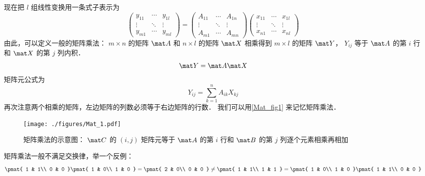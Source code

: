 现在把 $l$ 组线性变换用一条式子表示为
\begin{equation}
\begin{pmatrix}
y_{11} & \cdots & y_{1l} \\
 \vdots & \ddots & \vdots \\
y_{m1} & \cdots & y_{ml}
\end{pmatrix}
=
\begin{pmatrix}
A_{11} & \cdots & A_{1n} \\
 \vdots & \ddots & \vdots \\
A_{m1} & \cdots & A_{mn}
\end{pmatrix}
\begin{pmatrix}
x_{11} & \cdots & x_{1l} \\
 \vdots & \ddots & \vdots \\
x_{n1} & \cdots & x_{nl}
\end{pmatrix}
\end{equation}
由此，可以定义一般的矩阵乘法： $m \times n$ 的矩阵 $\mat A$ 和 $n \times l$ 的矩阵 $\mat X$ 相乘得到 $m \times l$ 的矩阵 $\mat Y$，  $Y_{ij}$ 等于 $\mat A$ 的第 $i$ 行和 $\mat X$ 的第 $j$ 列内积．
\begin{equation}
\mat Y=\mat A\mat X
\end{equation}
矩阵元公式为
\begin{equation}
Y_{ij} = \sum_{k = 1}^n A_{ik} X_{kj}
\end{equation}
再次注意两个相乘的矩阵，左边矩阵的列数必须等于右边矩阵的行数． 我们可以用\autoref{Mat_fig1} 来记忆矩阵乘法．

\begin{figure}[ht]
\centering
\texttt{[image: ./figures/Mat\_1.pdf]}
\caption{矩阵乘法的示意图： $\mat C$ 的 $(i, j)$ 矩阵元等于 $\mat A$ 的第 $i$ 行和 $\mat B$ 的第 $j$ 列逐个元素相乘再相加} \label{Mat_fig1}
\end{figure}

矩阵乘法一般不满足交换律，举一个反例：
\begin{equation}
\pmat{ 1 & 1\\ 0 & 0 }
\pmat{ 1 & 0\\ 1 & 0 } =
\pmat{ 2 & 0\\ 0 & 0 } \ne
\pmat{ 1 & 1\\ 1 & 1 } =
\pmat{ 1 & 0\\ 1 & 0 }
\pmat{ 1 & 1\\ 0 & 0 }
\end{equation}

